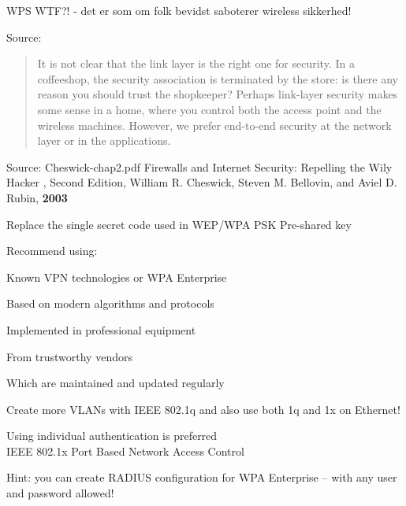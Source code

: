 \documentclass[Screen16to9,17pt]{foils}
\begin{document}
\vskip 2cm
\centerline{WPS WTF?! - det er som om folk bevidst saboterer wireless sikkerhed!}
\vskip 2cm

Source: 



\begin{quote}
It is not clear that the link layer is the right one for security. In a coffeeshop, the security association is terminated by the store: is there any reason you should trust the shopkeeper? Perhaps link-layer security makes some sense in a home, where you control both the access point and the wireless machines. However, we prefer end-to-end security at the network layer or in the
applications.
\end{quote} Source: Cheswick-chap2.pdf Firewalls and Internet Security: Repelling the Wily Hacker , Second Edition, William R. Cheswick, Steven M. Bellovin, and Aviel D. Rubin, {\bf 2003}




Replace the single secret code used in WEP/WPA PSK Pre-shared key

Recommend using:
\begin{list2}
\item Known VPN technologies or WPA Enterprise
\item Based on modern algorithms and protocols
\item Implemented in professional equipment
\item From trustworthy vendors
\item Which are maintained and updated regularly
\item Create more VLANs with IEEE 802.1q and also use both 1q and 1x on Ethernet!
\item Using individual authentication is preferred\\
IEEE 802.1x Port Based Network Access Control
\item Hint: you can create RADIUS configuration for WPA Enterprise -- with any user and password allowed!\\
\end{list2}


\end{document}
